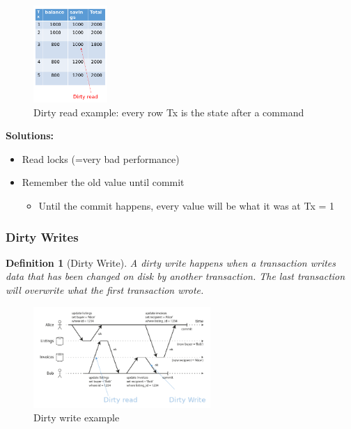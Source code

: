 \documentclass{article}
\newtheorem{theorem}{Definition}[section]
\begin{document}
\begin{figure}[H]
    \centering
    \includegraphics[width=0.25\textwidth]{dirty-reads.png}
    \caption{Dirty read example: every row Tx is the state after a command}
\end{figure}
 

\textbf{Solutions:}

\begin{itemize}
    \item Read locks (=very bad performance)
    \item Remember the old value until commit
    \begin{itemize}
        \item Until the commit happens, every value will be what it was at Tx = 1
    \end{itemize}
\end{itemize}

\subsubsection{Dirty Writes}

\begin{theorem}[Dirty Write]
A dirty write happens when a transaction writes data that has been changed on disk by another transaction. 
The last transaction will overwrite what the first transaction wrote.
\end{theorem}


\begin{figure}[H]
    \centering
    \includegraphics[width=0.6\textwidth]{dirty-reads-lock.png}
    \caption{Dirty write example}
\end{figure}
\end{document}
